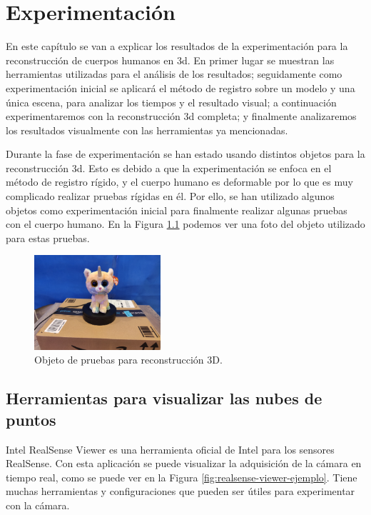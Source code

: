\chapter{Experimentación}
\label{cap:experimentacion}

En este capítulo se van a explicar los resultados de la experimentación para la reconstrucción de cuerpos humanos en \gls{3d}.
En primer lugar se muestran las herramientas utilizadas para el análisis de los resultados; seguidamente como experimentación inicial se aplicará el método de registro sobre un modelo y una única escena, para analizar los tiempos y el resultado visual; a continuación experimentaremos con la reconstrucción \gls{3d} completa; y finalmente analizaremos los resultados visualmente con las herramientas ya mencionadas.

Durante la fase de experimentación se han estado usando distintos objetos para la reconstrucción \gls{3d}.
Esto es debido a que la experimentación se enfoca en el método de registro rígido, y el cuerpo humano es deformable por lo que es muy complicado realizar pruebas rígidas en él.
Por ello, se han utilizado algunos objetos como experimentación inicial para finalmente realizar algunas pruebas con el cuerpo humano. En la Figura \ref{fig:objetos-experimentacion} podemos ver una foto del objeto utilizado para estas pruebas.

\begin{figure}[h]
    \centering
    \includegraphics[height=3.5cm]{archivos/experimentacion-gato.png}
    \caption{Objeto de pruebas para reconstrucción 3D.}
    \label{fig:objetos-experimentacion}
\end{figure}

\section{Herramientas para visualizar las nubes de puntos}

Intel RealSense Viewer es una herramienta oficial de Intel para los sensores RealSense.
Con esta aplicación se puede visualizar la adquisición de la cámara en tiempo real, como se puede ver en la Figura \ref{fig:realsense-viewer-ejemplo}.
Tiene muchas herramientas y configuraciones que pueden ser útiles para experimentar con la cámara.

